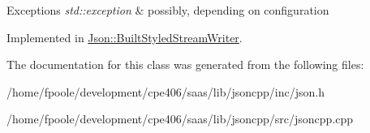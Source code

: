 \begin{DoxyExceptions}{Exceptions}
{\em std\+::exception} & possibly, depending on configuration \\
\hline
\end{DoxyExceptions}


Implemented in \hyperlink{struct_json_1_1_built_styled_stream_writer_a2ecffc3d66c4feddf208e5cd3b1c0f18}{Json\+::\+Built\+Styled\+Stream\+Writer}.



The documentation for this class was generated from the following files\+:\begin{DoxyCompactItemize}
\item 
/home/fpoole/development/cpe406/saas/lib/jsoncpp/inc/json.\+h\item 
/home/fpoole/development/cpe406/saas/lib/jsoncpp/src/jsoncpp.\+cpp\end{DoxyCompactItemize}
